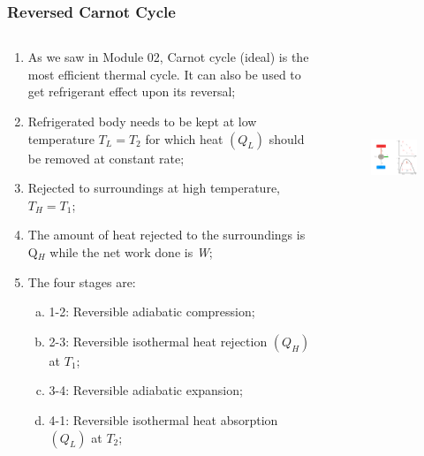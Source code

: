 \documentclass[10pt,compress]{beamer}
\begin{document}
\begin{frame}
 \frametitle{Reversed Carnot Cycle}
  \begin{columns}
   \begin{column}[c]{0.45\linewidth}
    \begin{enumerate}[(1)]\scriptsize
      \item <1-> As we saw in Module 02, Carnot cycle (ideal) is the most efficient thermal cycle. It can also be used to get refrigerant effect upon its reversal;
      \item <1-> Refrigerated body needs to be kept at low temperature $T_{L}=T_{2}$ for which heat $\left(Q_{L}\right)$ should be removed at constant rate;
      \item <1-> Rejected to surroundings at high temperature, $T_{H}=T_{1}$;
      \item <1-> The amount of heat rejected to the surroundings is Q$_{H}$ while the net work done is {\it W};
      \item <1->The four stages are:
        \begin{enumerate}[(a)]\scriptsize
          \item<2-> 1-2: Reversible adiabatic compression;
          \item<2-> 2-3: Reversible isothermal heat rejection $\left(Q_{H}\right)$ at $T_{1}$;
          \item<2-> 3-4: Reversible adiabatic expansion;
          \item<2-> 4-1: Reversible isothermal heat absorption $\left(Q_{L}\right)$ at $T_{2}$;
        \end{enumerate}
     \end{enumerate}
   \end{column}
   \begin{column}[c]{0.55\linewidth}
    \begin{figure}%
     \begin{center}
      \includegraphics[width=6.8cm,height=6.5cm]{./Pics/Overview_Refrig4}
     \end{center}
    \end{figure}
   \end{column}   
  \end{columns}
\end{frame}
 
\end{document}
